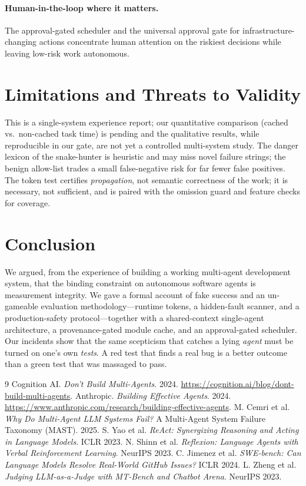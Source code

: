 \documentclass[10pt,twocolumn]{article}
\begin{document}
\paragraph{Human-in-the-loop where it matters.}
The approval-gated scheduler and the universal approval gate for
infrastructure-changing actions concentrate human attention on the riskiest
decisions while leaving low-risk work autonomous.

\section{Limitations and Threats to Validity}\label{sec:limits}
This is a single-system experience report; our quantitative comparison
(cached vs.\ non-cached task time) is pending and the qualitative results,
while reproducible in our gate, are not yet a controlled multi-system study.
The danger lexicon of the snake-hunter is heuristic and may miss novel failure
strings; the benign allow-list trades a small false-negative risk for far fewer
false positives. The token test certifies \emph{propagation}, not semantic
correctness of the work; it is necessary, not sufficient, and is paired with
the omission guard and feature checks for coverage.

\section{Conclusion}
We argued, from the experience of building a working multi-agent development
system, that the binding constraint on autonomous software agents is
measurement integrity. We gave a formal account of fake success and an
un-gameable evaluation methodology---runtime tokens, a hidden-fault scanner,
and a production-safety protocol---together with a shared-context single-agent
architecture, a provenance-gated module cache, and an approval-gated scheduler.
Our incidents show that the same scepticism that catches a lying \emph{agent}
must be turned on one's own \emph{tests}. A red test that finds a real bug is a
better outcome than a green test that was massaged to pass.

\balance
\begin{thebibliography}{9}
\small
{} Cognition AI. \emph{Don't Build Multi-Agents}. 2024.
\url{https://cognition.ai/blog/dont-build-multi-agents}.
 Anthropic. \emph{Building Effective Agents}. 2024.
\url{https://www.anthropic.com/research/building-effective-agents}.
 M. Cemri et al. \emph{Why Do Multi-Agent LLM Systems Fail?}
A Multi-Agent System Failure Taxonomy (MAST). 2025.
 S. Yao et al. \emph{ReAct: Synergizing Reasoning and Acting in
Language Models}. ICLR 2023.
 N. Shinn et al. \emph{Reflexion: Language Agents with Verbal
Reinforcement Learning}. NeurIPS 2023.
 C. Jimenez et al. \emph{SWE-bench: Can Language Models
Resolve Real-World GitHub Issues?} ICLR 2024.
 L. Zheng et al. \emph{Judging LLM-as-a-Judge with MT-Bench and
Chatbot Arena}. NeurIPS 2023.
\end{thebibliography}
\end{document}

